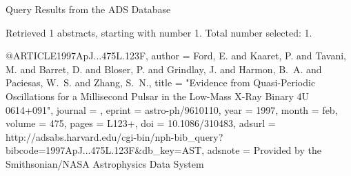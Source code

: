 Query Results from the ADS Database


Retrieved 1 abstracts, starting with number 1.  Total number selected: 1.

@ARTICLE{1997ApJ...475L.123F,
   author = {{Ford}, E. and {Kaaret}, P. and {Tavani}, M. and {Barret}, D. and 
	{Bloser}, P. and {Grindlay}, J. and {Harmon}, B.~A. and {Paciesas}, W.~S. and 
	{Zhang}, S.~N.},
    title = "{Evidence from Quasi-Periodic Oscillations for a Millisecond Pulsar in the Low-Mass X-Ray Binary 4U 0614+091}",
  journal = {\apjl},
   eprint = {astro-ph/9610110},
     year = 1997,
    month = feb,
   volume = 475,
    pages = {L123+},
      doi = {10.1086/310483},
   adsurl = {http://adsabs.harvard.edu/cgi-bin/nph-bib_query?bibcode=1997ApJ...475L.123F&db_key=AST},
  adsnote = {Provided by the Smithsonian/NASA Astrophysics Data System}
}


